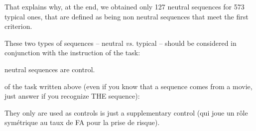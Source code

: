 \documentclass[sigconf]{acmart}
\begin{document}
That explains why, at the end, we obtained only 127 neutral sequences for 573 typical ones, that are defined as being non neutral sequences that meet the first criterion.


These two types of sequences -- neutral \textit{vs.} typical -- should be considered in conjunction with the instruction of the task: 

neutral sequences are control.

 of the task written above (even if you know that a sequence comes from a movie, just answer if you recognize THE sequence): 
 
They only are used as controls is just a supplementary control (qui joue un rôle symétrique au taux de FA pour la prise de risque).










\end{document}
